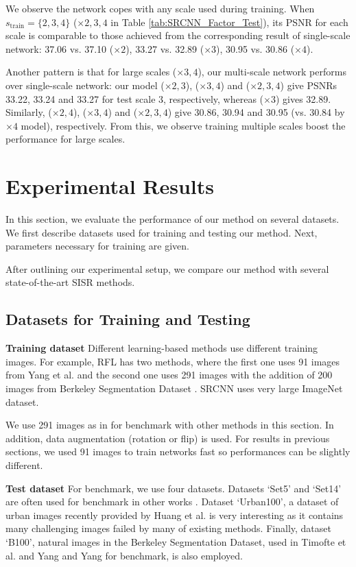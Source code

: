 \documentclass[10pt,twocolumn,letterpaper]{article}
\begin{document}
We observe the network copes with any scale used during training. When $s_{\text{train}} = \{2,3,4\}$ ($\times 2, 3, 4$ in Table \ref{tab:SRCNN_Factor_Test}), its PSNR for each scale is comparable to those achieved from the corresponding result of single-scale network: 37.06 vs. 37.10 ($\times 2$), 33.27 vs. 32.89 ($\times 3$), 30.95 vs. 30.86 ($\times 4$).

Another pattern is that for large scales ($\times 3,4$), our multi-scale network performs over single-scale network: our model ($\times 2,3$), ($\times 3,4$) and ($\times 2, 3,4$) give PSNRs 33.22, 33.24 and 33.27 for test scale 3, respectively, whereas ($\times 3$) gives 32.89. Similarly, ($\times 2,4$), ($\times 3,4$) and ($\times 2, 3,4$) give 30.86, 30.94 and 30.95 (vs. 30.84 by $\times 4$ model),  respectively. From this, we observe training multiple scales boost the performance for large scales.



\section{Experimental Results}
\label{sec:exp}
In this section, we evaluate the performance of our method on several datasets. We first describe datasets used for training and testing our method. Next, parameters necessary for training are given. 

After outlining our experimental setup, we compare our method with several state-of-the-art SISR methods. 

\subsection{Datasets for Training and Testing}
\textbf{Training dataset} Different learning-based methods use different training images. For example, RFL \cite{schulter2015fast} has two methods, where the first one uses 91 images from Yang et al. \cite{yang2010image} and the second one uses 291 images with the addition of 200 images from Berkeley Segmentation Dataset \cite{Martin2001}. SRCNN \cite{dong2015image} uses very large ImageNet dataset. 

We use 291 images as in \cite{schulter2015fast} for benchmark with other methods in this section. In addition, data augmentation (rotation or flip) is used. For results in previous sections, we used 91 images to train networks fast so performances can be slightly different. 

\textbf{Test dataset} For benchmark, we use four datasets. Datasets `Set5' \cite{bevilacqua2012} and `Set14' \cite{zeyde2012single} are often used for benchmark in other works \cite{Timofte,Timofte2013,Dong2014}. Dataset `Urban100', a dataset of urban images recently provided by Huang et al. \cite{Huang-CVPR-2015} is very interesting as it contains many challenging images failed by many of existing methods. Finally, dataset `B100', natural images in the Berkeley Segmentation Dataset, used in Timofte et al. \cite{Timofte} and Yang and Yang \cite{Yang2013} for benchmark, is also employed. 
\end{document}
